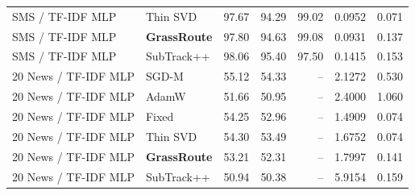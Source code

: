 {\begin{longtable}{llrrrrr}
SMS / TF-IDF MLP & Thin SVD & 97.67 & 94.29 & 99.02 & 0.0952 & 0.071\\
\rowcolor{oursbg}SMS / TF-IDF MLP & \textbf{GrassRoute} & 97.80 & 94.63 & 99.08 & 0.0931 & 0.137\\
SMS / TF-IDF MLP & SubTrack++ & 98.06 & 95.40 & 97.50 & 0.1415 & 0.153\\
20 News / TF-IDF MLP & SGD-M & 55.12 & 54.33 & -- & 2.1272 & 0.530\\
20 News / TF-IDF MLP & AdamW & 51.66 & 50.95 & -- & 2.4000 & 1.060\\
20 News / TF-IDF MLP & Fixed & 54.25 & 52.96 & -- & 1.4909 & 0.074\\
20 News / TF-IDF MLP & Thin SVD & 54.30 & 53.49 & -- & 1.6752 & 0.074\\
\rowcolor{oursbg}20 News / TF-IDF MLP & \textbf{GrassRoute} & 53.21 & 52.31 & -- & 1.7997 & 0.141\\
20 News / TF-IDF MLP & SubTrack++ & 50.94 & 50.38 & -- & 5.9154 & 0.159\\
\bottomrule\end{longtable}
}
